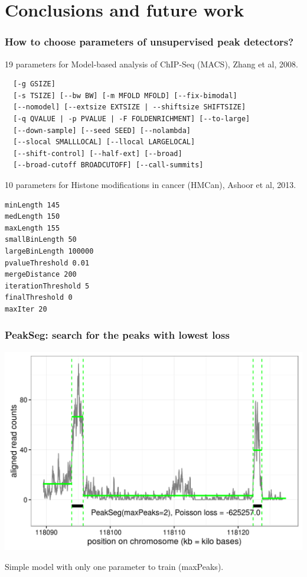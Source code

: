\documentclass{beamer}
\begin{document}
\section{Conclusions and future work}

\begin{frame}[fragile]
  \frametitle{How to choose parameters of unsupervised peak
    detectors?}
\scriptsize
19 parameters for Model-based analysis of ChIP-Seq (MACS), Zhang et al, 2008.
\begin{verbatim}
  [-g GSIZE]
  [-s TSIZE] [--bw BW] [-m MFOLD MFOLD] [--fix-bimodal]
  [--nomodel] [--extsize EXTSIZE | --shiftsize SHIFTSIZE]
  [-q QVALUE | -p PVALUE | -F FOLDENRICHMENT] [--to-large]
  [--down-sample] [--seed SEED] [--nolambda]
  [--slocal SMALLLOCAL] [--llocal LARGELOCAL]
  [--shift-control] [--half-ext] [--broad]
  [--broad-cutoff BROADCUTOFF] [--call-summits]
\end{verbatim}
10 parameters for Histone modifications in cancer (HMCan),
Ashoor et al, 2013.
\begin{verbatim}
minLength 145
medLength 150
maxLength 155
smallBinLength 50
largeBinLength 100000
pvalueThreshold 0.01
mergeDistance 200
iterationThreshold 5
finalThreshold 0
maxIter 20
\end{verbatim}
\end{frame}

\begin{frame}
  \frametitle{PeakSeg: search for the peaks with lowest loss}
  \includegraphics[width=1\textwidth]{figure-macs-problem-PeakSeg.png}
  
  Simple model with only one parameter to train (maxPeaks).
\end{frame}
\end{document}
